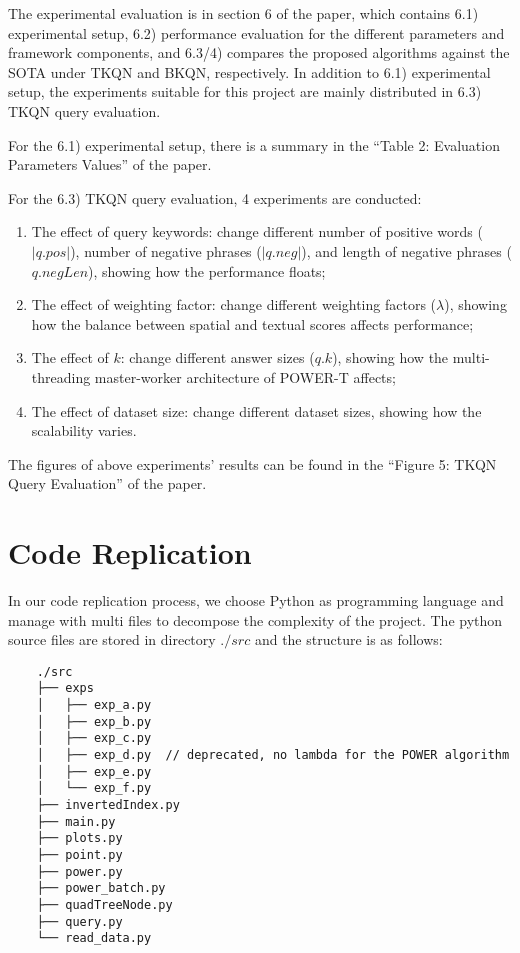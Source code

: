 \documentclass[]{IEEEphot}
\begin{document}
The experimental evaluation is in section 6 of the paper, which contains 6.1) experimental setup, 6.2) performance evaluation for the different parameters and framework components, and 6.3/4) compares the proposed algorithms against the SOTA under TKQN and BKQN, respectively. In addition to 6.1) experimental setup, the experiments suitable for this project are mainly distributed in 6.3) TKQN query evaluation.

For the 6.1) experimental setup, there is a summary in the “Table 2: Evaluation Parameters Values” of the paper.

For the 6.3) TKQN query evaluation, 4 experiments are conducted:

\begin{enumerate}
    \item The effect of query keywords: change different number of positive words ($|q.pos|$), number of negative phrases ($|q.neg|$), and length of negative phrases ($q.negLen$), showing how the performance floats;
    \item The effect of weighting factor: change different weighting factors ($\lambda$), showing how the balance between spatial and textual scores affects performance;
    \item The effect of $k$: change different answer sizes ($q.k$), showing how the multi-threading master-worker architecture of POWER-T affects;
    \item The effect of dataset size: change different dataset sizes, showing how the scalability varies.
\end{enumerate}

The figures of above experiments’ results can be found in the “Figure 5: TKQN Query Evaluation” of the paper.

\section{Code Replication}

In our code replication process, we choose Python as programming language and manage with multi files to decompose the complexity of the project. The python source files are stored in directory $./src$ and the structure is as follows:

\begin{lstlisting}
    ./src
    ├── exps
    │   ├── exp_a.py
    │   ├── exp_b.py
    │   ├── exp_c.py
    │   ├── exp_d.py  // deprecated, no lambda for the POWER algorithm
    │   ├── exp_e.py
    │   └── exp_f.py
    ├── invertedIndex.py
    ├── main.py
    ├── plots.py
    ├── point.py
    ├── power.py
    ├── power_batch.py
    ├── quadTreeNode.py
    ├── query.py
    └── read_data.py
\end{lstlisting}
\end{document}
